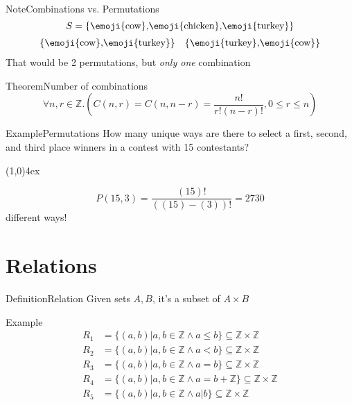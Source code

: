 \documentclass{MathNotes}
\newenvironment{example}[1]{\begin{BlueBox}{Example}{#1}}{\end{BlueBox}}
\newenvironment{definition}[1]{\begin{RedBox}{Definition}{#1}}{\end{RedBox}}
\newenvironment{note}[1]{\begin{YellowBox}{Note}{#1}}{\end{YellowBox}}
\newenvironment{theorem}[1]{\begin{GrayBox}{Theorem}{#1}}{\end{GrayBox}}
\newcommand{\br}{
	\begin{center}
		\line(1,0){4ex}
	\end{center}
}
\begin{document}
\begin{note}{Combinations vs. Permutations}
    \[S=\{\text{\emoji{cow},\emoji{chicken},\emoji{turkey}}\}\]
    \begin{align*}
        \{\text{\emoji{cow},\emoji{turkey}}\} && \{\text{\emoji{turkey},\emoji{cow}}\}
    \end{align*}
    That would be 2 permutations, but \textit{only one} combination
\end{note}

\begin{theorem}{Number of combinations}
    \[\forall n,r\in\mathbb{Z}.\left(C(n,r)=C(n,n-r)=\frac{n!}{r!\left(n-r\right)!},0\leq r\leq n\right)\]
\end{theorem}

\begin{example}{Permutations}
    How many unique ways are there to select a first, second, and third place
    winners in a contest with 15 contestants?
    \br
    \[P(15,3)=\frac{(15)!}{\left((15)-(3)\right)!}=2730\]
    different ways!
\end{example}

\section{Relations}
\begin{definition}{Relation}
	Given sets $A,B$, it's a subset of $A\times B$
\end{definition}

\begin{example}{}
	\begin{align*}
		R_1 & = \{(a,b)|a,b\in\mathbb{Z}\land a\leq b\}\subseteq\mathbb{Z}\times\mathbb{Z}        \\
		R_2 & = \{(a,b)|a,b\in\mathbb{Z}\land a<b\}\subseteq\mathbb{Z}\times\mathbb{Z}            \\
		R_3 & = \{(a,b)|a,b\in\mathbb{Z}\land a=b\}\subseteq\mathbb{Z}\times\mathbb{Z}            \\
		R_4 & = \{(a,b)|a,b\in\mathbb{Z}\land a=b+\mathbb{Z}\}\subseteq\mathbb{Z}\times\mathbb{Z} \\
		R_5 & = \{(a,b)|a,b\in\mathbb{Z}\land a|b\}\subseteq\mathbb{Z}\times\mathbb{Z}
	\end{align*}
\end{example}
\end{document}
